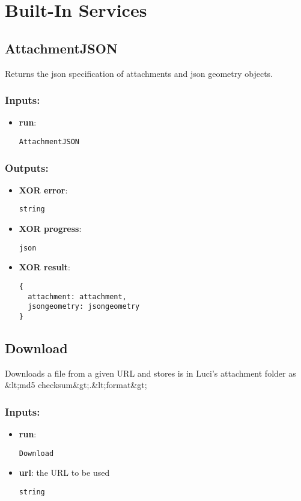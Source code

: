 \section{Built-In Services}
\label{ch:builtinservices}

\subsection{AttachmentJSON}
\label{ch:builtinservices:AttachmentJSON}
Returns the json specification of attachments and json geometry objects.
\subsubsection*{Inputs:}
\begin{itemize}
  \small
    \item \textbf{run}: 
\begin{lstlisting}
AttachmentJSON
\end{lstlisting}
  \end{itemize}
\subsubsection*{Outputs:}
\begin{itemize}
  \small
    \item \textbf{XOR error}: 
\begin{lstlisting}
string
\end{lstlisting}
    \item \textbf{XOR progress}: 
\begin{lstlisting}
json
\end{lstlisting}
    \item \textbf{XOR result}: 
\begin{lstlisting}
{
  attachment: attachment, 
  jsongeometry: jsongeometry
}
\end{lstlisting}
  \end{itemize}

\subsection{Download}
\label{ch:builtinservices:Download}
Downloads
 a file from a given URL and stores is in Luci's attachment folder as 
\&lt;md5 checksum\&gt;.\&lt;format\&gt; 
\subsubsection*{Inputs:}
\begin{itemize}
  \small
    \item \textbf{run}: 
\begin{lstlisting}
Download
\end{lstlisting}
    \item \textbf{url}: the URL to be used
\begin{lstlisting}
string
\end{lstlisting}
  \end{itemize}
